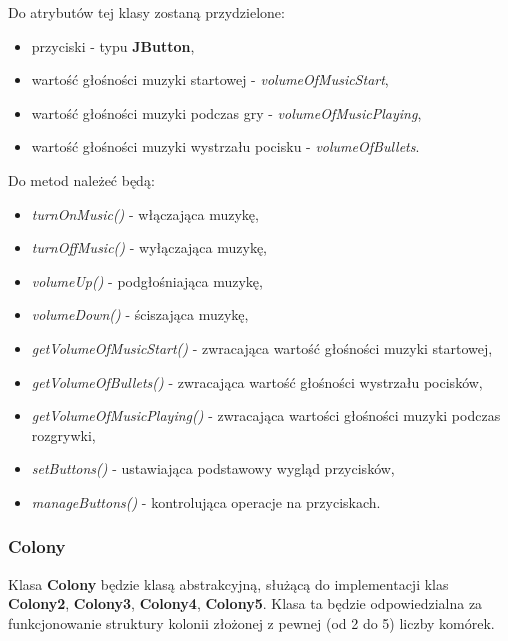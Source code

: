 \documentclass[a4paper]{article}
\begin{document}
Do atrybut\'ow tej klasy zostan\k{a} przydzielone:
\begin{itemize}
    \item przyciski - typu \textbf{JButton},
    \item warto\'s\'c g\l{}o\'sno\'sci muzyki startowej - \textit{volumeOfMusicStart},
    \item warto\'s\'c g\l{}o\'sno\'sci muzyki podczas gry - \textit{volumeOfMusicPlaying},
    \item warto\'s\'c g\l{}o\'sno\'sci muzyki wystrza\l{}u pocisku - \textit{volumeOfBullets}.
\end{itemize}

Do metod nale\.ze\'c b\k{e}d\k{a}: 
\begin{itemize}
    \item \textit{turnOnMusic()} - w\l{}\k{a}czaj\k{a}ca muzyk\k{e},
    \item \textit{turnOffMusic()} - wy\l{}\k{a}czaj\k{a}ca muzyk\k{e},
    \item \textit{volumeUp()} - podg\l{}o\'sniaj\k{a}ca muzyk\k{e},
    \item \textit{volumeDown()} - \'sciszaj\k{a}ca muzyk\k{e},
    \item \textit{getVolumeOfMusicStart()} - zwracaj\k{a}ca warto\'s\'c g\l{}o\'sno\'sci muzyki startowej,
    \item \textit{getVolumeOfBullets()} - zwracaj\k{a}ca warto\'s\'c g\l{}o\'sno\'sci wystrza\l{}u pocisk\'ow,
    \item \textit{getVolumeOfMusicPlaying()} - zwracaj\k{a}ca warto\'sci g\l{}o\'sno\'sci muzyki podczas rozgrywki,
    \item \textit{setButtons()} - ustawiaj\k{a}ca podstawowy wygl\k{a}d przycisk\'ow,
    \item \textit{manageButtons()} - kontroluj\k{a}ca operacje na przyciskach.
    
\end{itemize}

\subsubsection{Colony}

\quad Klasa \textbf{Colony} b\k{e}dzie klas\k{a} abstrakcyjn\k{a}, s\l{}u\.z\k{a}c\k{a} do implementacji klas \textbf{Colony2}, \textbf{Colony3}, \textbf{Colony4}, \textbf{Colony5}.
Klasa ta b\k{e}dzie odpowiedzialna za funkcjonowanie struktury kolonii z\l{}o\.zonej z pewnej (od 2 do 5) liczby kom\'orek. 
\end{document}
